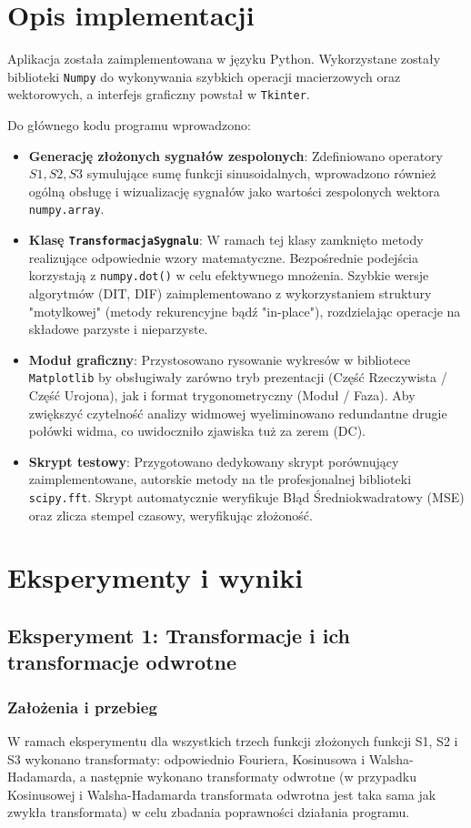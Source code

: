 \documentclass[12pt]{article}
\begin{document}
\section{Opis implementacji}
Aplikacja została zaimplementowana w języku Python. Wykorzystane zostały biblioteki \verb|Numpy| do wykonywania szybkich operacji macierzowych oraz wektorowych, a interfejs graficzny powstał w \verb|Tkinter|.

Do głównego kodu programu wprowadzono:
\begin{itemize}
    \item \textbf{Generację złożonych sygnałów zespolonych}: Zdefiniowano operatory $S1, S2, S3$ symulujące sumę funkcji sinusoidalnych, wprowadzono również ogólną obsługę i wizualizację sygnałów jako wartości zespolonych wektora \verb|numpy.array|.
    \item \textbf{Klasę \texttt{TransformacjaSygnalu}}: W ramach tej klasy zamknięto metody realizujące odpowiednie wzory matematyczne. Bezpośrednie podejścia korzystają z \verb|numpy.dot()| w celu efektywnego mnożenia. Szybkie wersje algorytmów (DIT, DIF) zaimplementowano z wykorzystaniem struktury "motylkowej" (metody rekurencyjne bądź "in-place"), rozdzielając operacje na składowe parzyste i nieparzyste.
    \item \textbf{Moduł graficzny}: Przystosowano rysowanie wykresów w bibliotece \verb|Matplotlib| by obsługiwały zarówno tryb prezentacji (Część Rzeczywista / Część Urojona), jak i format trygonometryczny (Moduł / Faza). Aby zwiększyć czytelność analizy widmowej wyeliminowano redundantne drugie połówki widma, co uwidoczniło zjawiska tuż za zerem (DC).
    \item \textbf{Skrypt testowy}: Przygotowano dedykowany skrypt porównujący zaimplementowane, autorskie metody na tle profesjonalnej biblioteki \verb|scipy.fft|. Skrypt automatycznie weryfikuje Błąd Średniokwadratowy (MSE) oraz zlicza stempel czasowy, weryfikując złożoność.
\end{itemize}

\section{Eksperymenty i wyniki}
\subsection{Eksperyment 1: Transformacje i ich transformacje odwrotne}
\subsubsection{Założenia i przebieg}
W ramach eksperymentu dla wszystkich trzech funkcji złożonych funkcji S1, S2 i S3 wykonano transformaty: odpowiednio Fouriera, Kosinusowa i Walsha-Hadamarda, a następnie wykonano transformaty odwrotne (w przypadku Kosinusowej i Walsha-Hadamarda transformata odwrotna jest taka sama jak zwykła transformata) w celu zbadania poprawności działania programu.
\end{document}
